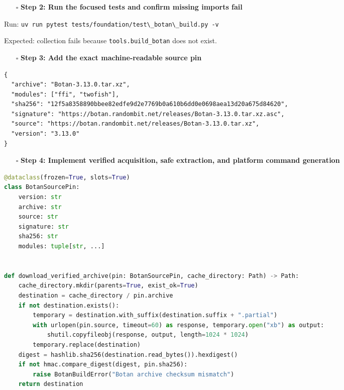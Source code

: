 \documentclass[
  letterpaper,
]{article}
\newcommand{\passthrough}[1]{#1}
\providecommand{\tightlist}{%
  \setlength{\itemsep}{0pt}\setlength{\parskip}{0pt}}
\begin{document}
\begin{itemize}
\tightlist
\item[$\square$]
  \textbf{Step 2: Run the focused tests and confirm missing imports fail}
\end{itemize}

Run: \passthrough{\lstinline!uv run pytest tests/foundation/test\_botan\_build.py -v!}

Expected: collection fails because \nolinkurl{tools.build_botan} does not exist.

\begin{itemize}
\tightlist
\item[$\square$]
  \textbf{Step 3: Add the exact machine-readable source pin}
\end{itemize}

\begin{lstlisting}
{
  "archive": "Botan-3.13.0.tar.xz",
  "modules": ["ffi", "twofish"],
  "sha256": "12f5a8358890bbee82edfe9d2e7769b0a610b6dd0e0698aea13d20a675d84620",
  "signature": "https://botan.randombit.net/releases/Botan-3.13.0.tar.xz.asc",
  "source": "https://botan.randombit.net/releases/Botan-3.13.0.tar.xz",
  "version": "3.13.0"
}
\end{lstlisting}

\begin{itemize}
\tightlist
\item[$\square$]
  \textbf{Step 4: Implement verified acquisition, safe extraction, and platform command generation}
\end{itemize}

\begin{lstlisting}[language=Python]
@dataclass(frozen=True, slots=True)
class BotanSourcePin:
    version: str
    archive: str
    source: str
    signature: str
    sha256: str
    modules: tuple[str, ...]


def download_verified_archive(pin: BotanSourcePin, cache_directory: Path) -> Path:
    cache_directory.mkdir(parents=True, exist_ok=True)
    destination = cache_directory / pin.archive
    if not destination.exists():
        temporary = destination.with_suffix(destination.suffix + ".partial")
        with urlopen(pin.source, timeout=60) as response, temporary.open("xb") as output:
            shutil.copyfileobj(response, output, length=1024 * 1024)
        temporary.replace(destination)
    digest = hashlib.sha256(destination.read_bytes()).hexdigest()
    if not hmac.compare_digest(digest, pin.sha256):
        raise BotanBuildError("Botan archive checksum mismatch")
    return destination
\end{lstlisting}
\end{document}
